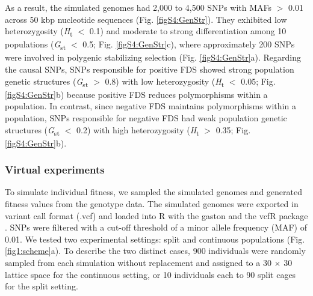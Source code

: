\documentclass[12pt,]{article}
\begin{document}
As a result, the simulated genomes had 2,000 to 4,500 SNPs with MAFs $>$ 0.01 across 50 kbp nucleotide sequences (Fig. \ref{figS4:GenStr}). They exhibited low heterozygosity (\textit{H}\textsubscript{t} $<$ 0.1) and moderate to strong differentiation among 10 populations (\textit{G}\textsubscript{st} $<$ 0.5; Fig. \ref{figS4:GenStr}c), where approximately 200 SNPs were involved in polygenic stabilizing selection (Fig. \ref{figS4:GenStr}a). Regarding the causal SNPs, SNPs responsible for positive FDS showed strong population genetic structures (\textit{G}\textsubscript{st} $>$ 0.8) with low heterozygosity (\textit{H}\textsubscript{t} $<$ 0.05; Fig. \ref{figS4:GenStr}b) because positive FDS reduces polymorphisms within a population. In contrast, since negative FDS maintains polymorphisms within a population, SNPs responsible for negative FDS had weak population genetic structures (\textit{G}\textsubscript{st} $<$ 0.2) with high heterozygosity (\textit{H}\textsubscript{t} $>$ 0.35; Fig. \ref{figS4:GenStr}b).


\subsubsection*{Virtual experiments}
To simulate individual fitness, we sampled the simulated genomes and generated fitness values from the genotype data. The simulated genomes were exported in variant call format (.vcf) and loaded into R with the gaston \citep{R_gaston} and the vcfR package \citep{knaus2017vcfr}. SNPs were filtered with a cut-off threshold of a minor allele frequency (MAF) of 0.01. We tested two experimental settings: split and continuous populations (Fig. \ref{fig1:scheme}a). To describe the two distinct cases, 900 individuals were randomly sampled from each simulation without replacement and assigned to a 30 $\times$ 30 lattice space for the continuous setting, or 10 individuals each to 90 split cages for the split setting.
\end{document}
